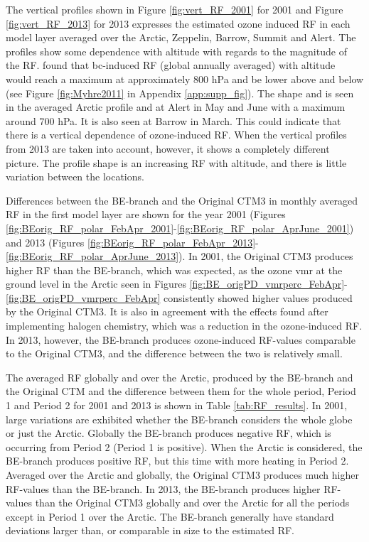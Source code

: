 \medskip

The vertical profiles shown in Figure \ref{fig:vert_RF_2001} for 2001 and Figure \ref{fig:vert_RF_2013} for 2013 expresses the estimated ozone induced RF in each model layer averaged over the Arctic, Zeppelin, Barrow, Summit and Alert. The profiles show some dependence with altitude with regards to the magnitude of the RF. \cite{MYHRE2011387} found that \acrfull{bc}-induced RF (global annually averaged) with altitude would reach a maximum at approximately 800 hPa and be lower above and below (see Figure \ref{fig:Myhre2011} in Appendix \ref{app:supp_fig}). The shape and is seen in the averaged Arctic profile and at Alert in May and June with a maximum around 700 hPa. It is also seen at Barrow in March. This could indicate that there is a vertical dependence of ozone-induced RF. When the vertical profiles from 2013 are taken into account, however, it shows a completely different picture. The profile shape is an increasing RF with altitude, and there is little variation between the locations. 


\medskip

Differences between the BE-branch and the Original CTM3 in monthly averaged RF in the first model layer are shown for the year 2001 (Figures \ref{fig:BEorig_RF_polar_FebApr_2001}-\ref{fig:BEorig_RF_polar_AprJune_2001}) and 2013 (Figures \ref{fig:BEorig_RF_polar_FebApr_2013}-\ref{fig:BEorig_RF_polar_AprJune_2013}). In 2001, the Original CTM3 produces higher RF than the BE-branch, which was expected, as the ozone \acrshort{vmr} at the ground level in the Arctic seen in Figures \ref{fig:BE_origPD_vmrperc_FebApr}-\ref{fig:BE_origPD_vmrperc_FebApr} consistently showed higher values produced by the Original CTM3. It is also in agreement with the effects \cite{Sherwen2017} found after implementing halogen chemistry, which was a reduction in the ozone-induced RF. In 2013, however, the BE-branch produces ozone-induced RF-values comparable to the Original CTM3, and the difference between the two is relatively small. 

\medskip


The averaged RF globally and over the Arctic, produced by the BE-branch and the Original CTM and the difference between them for the whole period, Period 1 and Period 2 for 2001 and 2013 is shown in Table \ref{tab:RF_results}. In 2001, large variations are exhibited whether the BE-branch considers the whole globe or just the Arctic. Globally the BE-branch produces negative RF, which is occurring from Period 2 (Period 1 is positive). When the Arctic is considered, the BE-branch produces positive RF, but this time with more heating in Period 2. Averaged over the Arctic and globally, the Original CTM3 produces much higher RF-values than the BE-branch. In 2013, the BE-branch produces higher RF-values than the Original CTM3 globally and over the Arctic for all the periods except in Period 1 over the Arctic. The BE-branch generally have standard deviations larger than, or comparable in size to the estimated RF. 

